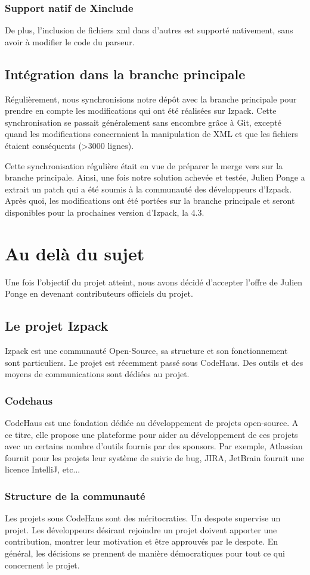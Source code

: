 \subsubsection{Support natif de Xinclude}
De plus, l'inclusion de fichiers xml dans d'autres est supporté nativement, sans avoir à modifier le code du parseur.
\subsection{Intégration dans la branche principale}
Régulièrement, nous synchronisions notre dépôt avec la branche principale pour prendre en compte les modifications qui ont été réalisées sur Izpack.
Cette synchronisation se passait généralement sans encombre grâce à Git, excepté quand les modifications concernaient la manipulation de XML et que les fichiers étaient conséquents (>3000 lignes).

Cette synchronisation régulière était en vue de préparer le merge vers sur la branche principale.
Ainsi, une fois notre solution achevée et testée, Julien Ponge a extrait un patch qui a été soumis à la communauté des développeurs d'Izpack.
Après quoi, les modifications ont été portées sur la branche principale et seront disponibles pour la prochaines version d'Izpack, la 4.3.
\section{Au delà du sujet}
Une fois l'objectif du projet atteint, nous avons décidé d'accepter l'offre de Julien Ponge en devenant contributeurs officiels du projet.
\subsection{Le projet Izpack}
Izpack est une communauté Open-Source, sa structure et son fonctionnement sont particuliers. 
Le projet est récemment passé sous CodeHaus. 
Des outils et des moyens de communications sont dédiées au projet.
\subsubsection{Codehaus}
CodeHaus est une fondation dédiée au développement de projets open-source.
A ce titre, elle propose une plateforme pour aider au développement de ces projets avec un certains nombre d'outils fournis par des sponsors.
Par exemple, Atlassian fournit pour les projets leur système de suivie de bug, JIRA, JetBrain fournit une licence IntelliJ, etc...
\subsubsection{Structure de la communauté}
Les projets sous CodeHaus sont des méritocraties. 
Un despote supervise un projet.
Les développeurs désirant rejoindre un projet doivent apporter une contribution, montrer leur motivation et être approuvés par le despote.
En général, les décisions se prennent de manière démocratiques pour tout ce qui concernent le projet.

